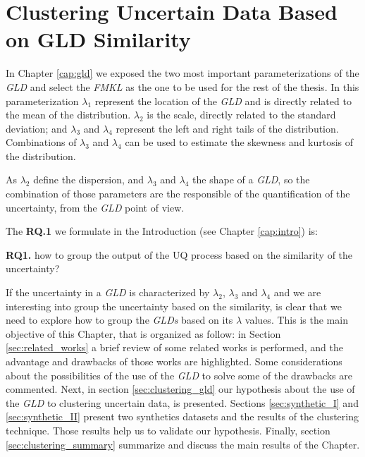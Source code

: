 \chapter[Clustering Uncertain Data Based on GLD Similarity]{Clustering Uncertain Data Based on GLD Similarity}\label{cap:gld_clustering}

In Chapter \ref{cap:gld} we exposed the two most important parameterizations of the \textit{GLD} and select the \textit{FMKL} as  the one to be used for the rest of the  thesis. In this parameterization $\lambda_{1}$ represent the location of the \textit{GLD} and is directly related to the mean of the distribution. $\lambda_{2}$ is the scale, directly related to the standard deviation; and $\lambda_{3}$ and $\lambda_{4}$ represent the left and right tails of the distribution. Combinations of $\lambda_{3}$ and $\lambda_{4}$ can be used to estimate the skewness and kurtosis of the distribution.

As $\lambda_{2}$ define the dispersion, and $\lambda_{3}$ and $\lambda_{4}$ the shape of a \textit{GLD}, so the combination of those parameters are the responsible of the quantification of the uncertainty, from the \textit{GLD} point of view.

The \textbf{RQ.1} we formulate in the Introduction (see Chapter \ref{cap:intro}) is:

\begin{tcolorbox}
\textbf{RQ1.} how to group the output of the UQ process based on the similarity of the uncertainty?
\end{tcolorbox}

If the uncertainty in a \textit{GLD} is characterized by $\lambda_{2}$, $\lambda_{3}$ and $\lambda_{4}$ and we are interesting into group the uncertainty based on the similarity, is clear that we need to explore how to group the \textit{GLDs} based on its $\lambda$ values. This is the main objective of this Chapter, that is organized as follow: in Section \ref{sec:related_works} a brief review of some related works is performed, and the advantage and drawbacks of those works are highlighted. Some considerations about the possibilities of the use of the \textit{GLD} to solve some of the drawbacks are commented. Next, in section \ref{sec:clustering_gld} our hypothesis about the use of the \textit{GLD} to clustering uncertain data, is presented. Sections \ref{sec:synthetic_I} and \ref{sec:synthetic_II} present two synthetics datasets and the results of the clustering technique. Those results help us to validate our hypothesis. Finally, section \ref{sec:clustering_summary} summarize and discuss the main results of the Chapter.


